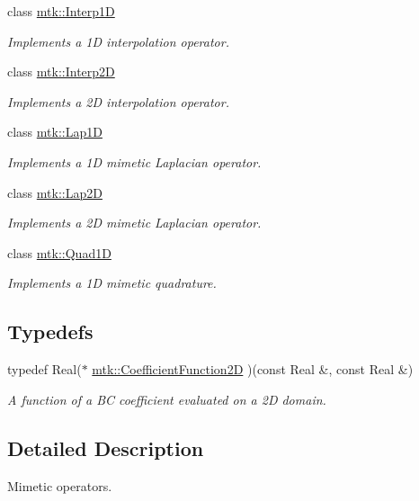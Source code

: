 \begin{DoxyCompactItemize}
class \hyperlink{classmtk_1_1Interp1D}{mtk\+::\+Interp1\+D}
\begin{DoxyCompactList}\small\item\em Implements a 1\+D interpolation operator. \end{DoxyCompactList}\item 
class \hyperlink{classmtk_1_1Interp2D}{mtk\+::\+Interp2\+D}
\begin{DoxyCompactList}\small\item\em Implements a 2\+D interpolation operator. \end{DoxyCompactList}\item 
class \hyperlink{classmtk_1_1Lap1D}{mtk\+::\+Lap1\+D}
\begin{DoxyCompactList}\small\item\em Implements a 1\+D mimetic Laplacian operator. \end{DoxyCompactList}\item 
class \hyperlink{classmtk_1_1Lap2D}{mtk\+::\+Lap2\+D}
\begin{DoxyCompactList}\small\item\em Implements a 2\+D mimetic Laplacian operator. \end{DoxyCompactList}\item 
class \hyperlink{classmtk_1_1Quad1D}{mtk\+::\+Quad1\+D}
\begin{DoxyCompactList}\small\item\em Implements a 1\+D mimetic quadrature. \end{DoxyCompactList}\end{DoxyCompactItemize}
\subsection*{Typedefs}
\begin{DoxyCompactItemize}
\item 
typedef Real($\ast$ \hyperlink{group__c07-mim__ops_gad9e1c0ace886b0029aefffa5f320e852}{mtk\+::\+Coefficient\+Function2\+D} )(const Real \&, const Real \&)
\begin{DoxyCompactList}\small\item\em A function of a B\+C coefficient evaluated on a 2\+D domain. \end{DoxyCompactList}\end{DoxyCompactItemize}


\subsection{Detailed Description}
Mimetic operators. 


